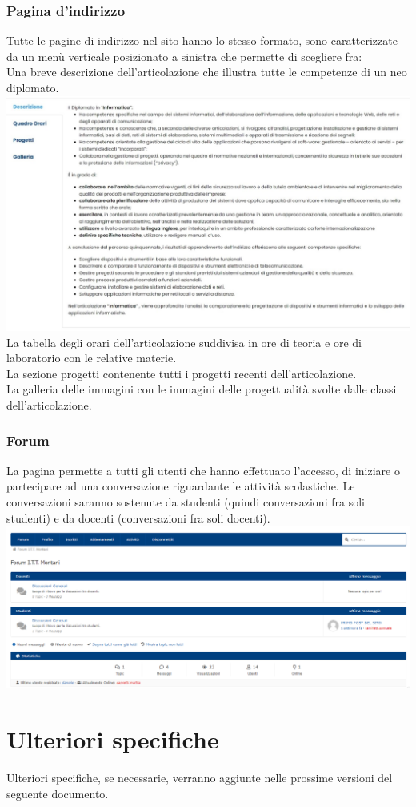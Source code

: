 \documentclass{article}
\begin{document}
	\subsubsection{\textbf{Pagina d'indirizzo}}
	Tutte le pagine di indirizzo nel sito hanno lo stesso formato, sono caratterizzate da un menù verticale posizionato a sinistra che permette di scegliere fra:\\
	\vspace{2mm}
	Una breve descrizione dell’articolazione che illustra tutte le competenze di un neo diplomato.
	\includegraphics[scale=0.4]{indirizzo1}\\
	La tabella degli orari dell’articolazione suddivisa in ore di teoria e ore di laboratorio con le relative materie.\\
	La sezione progetti contenente tutti i progetti recenti dell’articolazione.\\
	La galleria delle immagini con le immagini delle progettualità svolte dalle classi dell’articolazione.\\
	\subsubsection{\textbf{Forum}}
	La pagina permette a tutti gli utenti che hanno effettuato l’accesso, di iniziare o partecipare ad una conversazione riguardante le attività scolastiche.
	Le conversazioni saranno sostenute da studenti (quindi conversazioni fra soli studenti) e da docenti (conversazioni fra soli docenti).
	\includegraphics[scale=0.3]{forum}\\
\section{\textbf{Ulteriori specifiche}}
Ulteriori specifiche, se necessarie, verranno aggiunte nelle prossime versioni del seguente documento.
\end{document}
